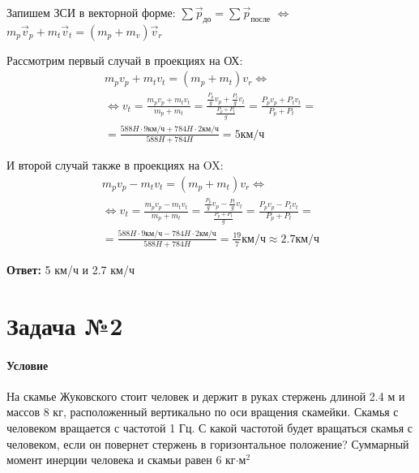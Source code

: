 \documentclass[a4paper,12pt]{article}
\begin{document}
    Запишем ЗСИ в векторной форме: $\sum{\vec{p}_{\text{до}}} = \sum{\vec{p}_{\text{после}}}$
    $\Leftrightarrow$ $m_p\vec{v}_p + m_t\vec{v}_t = (m_p + m_v)\vec{v}_r$

    Рассмотрим первый случай в проекциях на ОХ:
    \begin{multline}
        m_pv_p + m_tv_t = (m_p + m_t)v_r \Leftrightarrow \\ \Leftrightarrow
        v_t = \frac{m_pv_p + m_tv_t}{m_p + m_t} 
        = \frac{\frac{P_p}{g}v_p + \frac{P_t}{g}v_t}{\frac{P_p + P_t}{g}} =
        \frac{P_pv_p + P_tv_t}{P_p + P_t} = \\ =
        \frac{588H\cdot 9\text{км/ч} + 784H\cdot 2\text{км/ч}}{588H + 784H}
        = 5\text{км/ч}
    \end{multline}

    И второй случай также в проекциях на OX:
    \begin{multline}
        m_pv_p - m_tv_t = (m_p + m_t)v_r \Leftrightarrow \\ \Leftrightarrow
        v_t = \frac{m_pv_p - m_tv_t}{m_p + m_t} 
        = \frac{\frac{P_p}{g}v_p - \frac{P_t}{g}v_t}{\frac{P_p + P_t}{g}} =
        \frac{P_pv_p - P_tv_t}{P_p + P_t} = \\ =
        \frac{588H\cdot 9\text{км/ч} - 784H\cdot 2\text{км/ч}}{588H + 784H}
        = \frac{19}{7}\text{км/ч} \approx 2.7\text{км/ч}
    \end{multline}

    \begin{flushright}
        \textbf{Ответ:} 5 км/ч и 2.7 км/ч
    \end{flushright}

    \section*{Задача №2}

    \paragraph{Условие} На скамье Жуковского стоит человек и держит в руках стержень длиной
    2.4 м и массов 8 кг, расположенный вертикально по оси вращения скамейки. Скамья с человеком
    вращается с частотой 1 Гц. С какой частотой будет вращаться скамья с человеком, если он
    повернет стержень в горизонтальное положение? Суммарный момент инерции человека и
    скамьи равен 6 кг$\cdot$м$^2$
\end{document}
